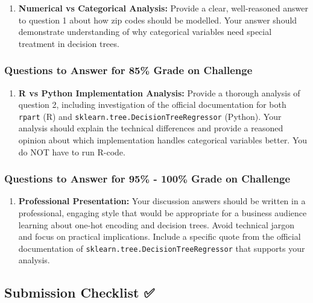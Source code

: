 \documentclass[
  letterpaper,
  DIV=11,
  numbers=noendperiod]{scrartcl}
\providecommand{\tightlist}{%
  \setlength{\itemsep}{0pt}\setlength{\parskip}{0pt}}
\begin{document}
\begin{enumerate}
\def\labelenumi{\arabic{enumi}.}
\tightlist
\item
  \textbf{Numerical vs Categorical Analysis:} Provide a clear,
  well-reasoned answer to question 1 about how zip codes should be
  modelled. Your answer should demonstrate understanding of why
  categorical variables need special treatment in decision trees.
\end{enumerate}

\subsubsection{Questions to Answer for 85\% Grade on
Challenge}\label{questions-to-answer-for-85-grade-on-challenge}

\begin{enumerate}
\def\labelenumi{\arabic{enumi}.}
\setcounter{enumi}{1}
\tightlist
\item
  \textbf{R vs Python Implementation Analysis:} Provide a thorough
  analysis of question 2, including investigation of the official
  documentation for both \texttt{rpart} (R) and
  \texttt{sklearn.tree.DecisionTreeRegressor} (Python). Your analysis
  should explain the technical differences and provide a reasoned
  opinion about which implementation handles categorical variables
  better. You do NOT have to run R-code.
\end{enumerate}

\subsubsection{Questions to Answer for 95\% - 100\% Grade on
Challenge}\label{questions-to-answer-for-95---100-grade-on-challenge}

\begin{enumerate}
\def\labelenumi{\arabic{enumi}.}
\setcounter{enumi}{2}
\tightlist
\item
  \textbf{Professional Presentation:} Your discussion answers should be
  written in a professional, engaging style that would be appropriate
  for a business audience learning about one-hot encoding and decision
  trees. Avoid technical jargon and focus on practical implications.
  Include a specific quote from the official documentation of
  \texttt{sklearn.tree.DecisionTreeRegressor} that supports your
  analysis.
\end{enumerate}

\subsection{Submission Checklist ✅}\label{submission-checklist}
\end{document}
